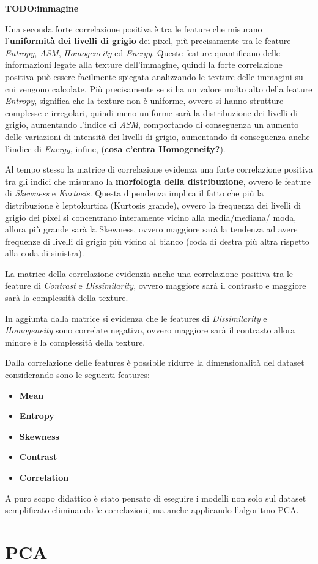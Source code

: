 \textbf{TODO:immagine}

Una seconda forte correlazione positiva è 
tra le feature che misurano l'\textbf{uniformità dei livelli di grigio} dei pixel,
più precisamente tra le feature \textit{Entropy}, \textit{ASM}, \textit{Homogeneity} 
ed \textit{Energy}. Queste feature quantificano delle informazioni legate alla
texture dell'immagine, quindi la forte correlazione positiva può essere facilmente
spiegata analizzando le texture delle immagini su cui vengono calcolate. Più precisamente
se si ha un valore molto alto della feature \textit{Entropy}, significa che la
texture non è uniforme, ovvero si hanno strutture complesse e irregolari, quindi
meno uniforme sarà la distribuzione dei livelli di grigio, aumentando l'indice
di \textit{ASM}, comportando di conseguenza un aumento delle variazioni di intensità
dei livelli di grigio, aumentando di conseguenza anche l'indice di \textit{Energy},
infine, (\textbf{cosa c'entra Homogeneity?}). 

Al tempo stesso la matrice di correlazione evidenza una forte correlazione positiva
tra gli indici che misurano la \textbf{morfologia della distribuzione}, ovvero 
le feature di \textit{Skewness} e \textit{Kurtosis}. Questa dipendenza implica il 
fatto che più la distribuzione è leptokurtica (Kurtosis grande), ovvero la frequenza
dei livelli di grigio dei pixel si concentrano interamente vicino alla media/mediana/
moda, allora più grande sarà la Skewness, ovvero maggiore sarà la tendenza ad avere
frequenze di livelli di grigio più vicino al bianco (coda di destra più altra rispetto
alla coda di sinistra).

La matrice della correlazione evidenzia anche una correlazione positiva tra le 
feature di \textit{Contrast} e \textit{Dissimilarity}, ovvero maggiore sarà il 
contrasto e maggiore sarà la complessità della texture. 

In aggiunta dalla matrice si evidenza che le features di \textit{Dissimilarity}
e \textit{Homogeneity} sono correlate negativo, ovvero maggiore sarà il contrasto
allora minore è la complessità della texture.

Dalla correlazione delle features è possibile ridurre la dimensionalità del dataset
considerando sono le seguenti features:
\begin{itemize}
    \item \textbf{Mean}
    \item \textbf{Entropy}
    \item \textbf{Skewness}
    \item \textbf{Contrast}
    \item \textbf{Correlation}
\end{itemize}

A puro scopo didattico è stato pensato di eseguire i modelli non solo sul dataset
semplificato eliminando le correlazioni, ma anche applicando l'algoritmo PCA.

\section{PCA}
